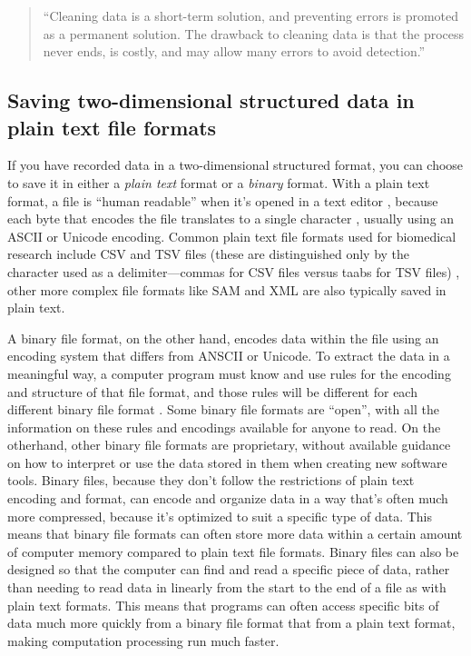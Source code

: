 \documentclass[]{tufte-book}
\begin{document}
\begin{quote}
``Cleaning data is a short-term solution, and preventing errors is promoted as
a permanent solution. The drawback to cleaning data is that the process never
ends, is costly, and may allow many errors to avoid detection.''
\citep{keller2017evolution}
\end{quote}

\hypertarget{saving-two-dimensional-structured-data-in-plain-text-file-formats}{%
\subsection{Saving two-dimensional structured data in plain text file formats}\label{saving-two-dimensional-structured-data-in-plain-text-file-formats}}

If you have recorded data in a two-dimensional structured format, you can choose
to save it in either a \emph{plain text} format or a \emph{binary} format. With a plain
text format, a file is ``human readable'' when it's opened in a text editor
\citep{hunt2000pragmatic, janssens2014data}, because each byte that encodes the file
translates to a single character \citep{murrell2009introduction}, usually using an
ASCII or Unicode encoding. Common plain text file formats used for biomedical
research include CSV and TSV files (these are distinguished only by the
character used as a delimiter---commas for CSV files versus taabs for TSV files)
\citep{buffalo2015bioinformatics}, other more complex file formats like SAM and XML
are also typically saved in plain text.

A binary file format, on the other hand, encodes data within the file using an
encoding system that differs from ANSCII or Unicode. To extract the data in a
meaningful way, a computer program must know and use rules for the encoding and
structure of that file format, and those rules will be different for each
different binary file format \citep{murrell2009introduction}. Some binary file
formats are ``open'', with all the information on these rules and encodings
available for anyone to read. On the otherhand, other binary file formats are
proprietary, without available guidance on how to interpret or use the data
stored in them when creating new software tools. Binary files, because they
don't follow the restrictions of plain text encoding and format, can encode and
organize data in a way that's often much more compressed, because it's optimized
to suit a specific type of data. This means that binary file formats can often
store more data within a certain amount of computer memory compared to plain
text file formats. Binary files can also be designed so that the computer can
find and read a specific piece of data, rather than needing to read data in
linearly from the start to the end of a file as with plain text formats. This
means that programs can often access specific bits of data much more quickly
from a binary file format that from a plain text format, making computation
processing run much faster.
\end{document}
